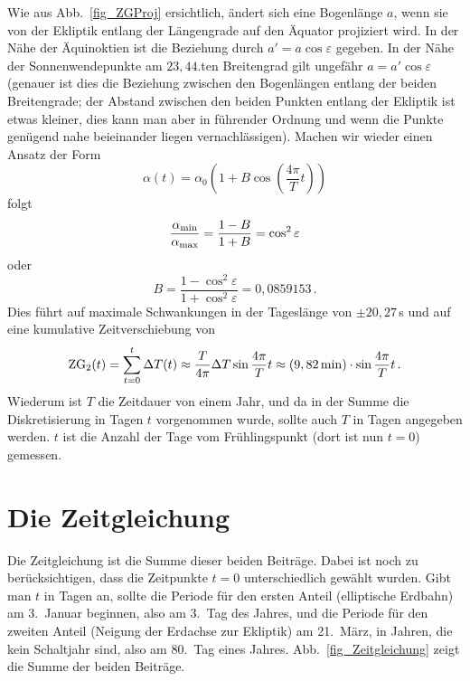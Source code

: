 Wie aus Abb.\ \ref{fig_ZGProj} ersichtlich, \"andert sich eine Bogenl\"ange $a$, wenn sie von der
Ekliptik entlang der L\"angengrade auf den \"Aquator projiziert wird. In der N\"ahe der
\"Aquinoktien ist die Beziehung durch $a'= a \cos \varepsilon$ gegeben. In der N\"ahe der
Sonnenwendepunkte am $23,44$.ten Breitengrad gilt ungef\"ahr 
\mbox{$a=a' \cos \varepsilon$} (genauer
ist dies die Beziehung zwischen den Bogenl\"angen entlang der beiden Breitengrade; der
Abstand zwischen den beiden Punkten entlang der Ekliptik ist etwas kleiner, dies kann man aber
in f\"uhrender Ordnung und wenn die Punkte gen\"ugend nahe beieinander liegen vernachl\"assigen).   
Machen wir wieder einen Ansatz der Form
\begin{equation}
                \alpha(t) = \alpha_0 \left( 1 + B \cos \left( \frac{4 \pi}{T} t \right) \right) 
\end{equation}
folgt   
\begin{equation}
                \frac{\alpha_{\rm min}}{\alpha_{\rm max}}  
                =  \frac{ 1 - B}{1+B} = \cos^2 \varepsilon  
\end{equation}
oder
\begin{equation}
               B =  \frac{ 1 - \cos^2 \varepsilon }{1+\cos^2 \varepsilon } =  0,0859153\, . 
\end{equation}
Dies f\"uhrt auf maximale Schwankungen in der Tagesl\"ange von $\pm 20,27$\,s und auf
eine kumulative Zeitverschiebung von 
\begin{equation}
     {\rm ZG}_2(t) = \sum_{t=0}^t \Delta T(t)  \approx  \frac{T}{4\pi} \Delta T \sin \frac{4\pi}{T}t  
                    \approx (9,82\,{\rm min})\cdot \sin \frac{4\pi}{T}t  \, .
\end{equation}
Wiederum ist $T$ die Zeitdauer von einem Jahr, und da in der Summe die Diskretisierung
in Tagen $t$ vorgenommen wurde, sollte auch $T$ in Tagen angegeben werden. 
$t$ ist die Anzahl der Tage vom Fr\"uhlingspunkt (dort ist nun $t=0$) gemessen.

\section{Die Zeitgleichung}

Die Zeitgleichung ist die Summe dieser beiden Beitr\"age. Dabei ist noch zu ber\"ucksichtigen,
dass die Zeitpunkte $t=0$ unterschiedlich gew\"ahlt wurden. Gibt man $t$ in Tagen an, sollte
die Periode f\"ur den ersten Anteil (elliptische Erdbahn) am 3.\ Januar beginnen, also am 3.\ Tag
des Jahres, und die Periode f\"ur den zweiten Anteil (Neigung der Erdachse zur Ekliptik) am
21.\ M\"arz, in Jahren, die kein Schaltjahr sind, also am 80.\ Tag eines Jahres. 
Abb.\ \ref{fig_Zeitgleichung} zeigt die Summe der beiden Beitr\"age.

